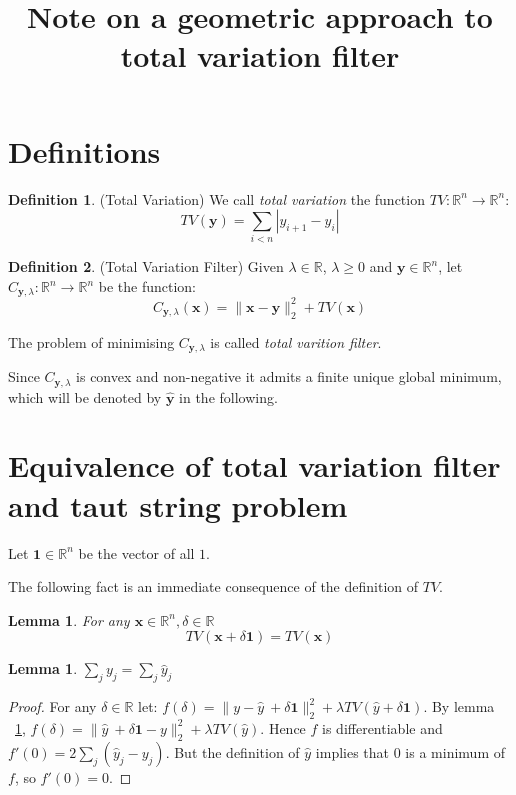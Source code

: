 \documentclass{article}
\newtheorem{lemma}[theorem]{Lemma}
\theoremstyle{definition}
\newtheorem{definition}{Definition}[section]
\def\*#1{\mathbf{#1}}
\def\R{\mathbb{R}}
\begin{document}
\title{Note on a geometric approach to total variation filter}
\author{}

\maketitle

\section{Definitions}

\begin{definition}{(Total Variation)}
  We call {\em total variation} the function $TV:\R^n \rightarrow \R^n$:
  \[TV(\*y) = \sum_{i < n} |y_{i+1} - y_{i}| \]
\end{definition}

\begin{definition}{(Total Variation Filter)}
  Given $\lambda \in \R$, $\lambda \geq 0$ and $\*y \in \R^n$, let $C_{\*y, \lambda}: \R^n \rightarrow \R^n$
  be the function:
    \[ C_{\*y, \lambda} (\*x) = \|\*x - \*y \|^2_2 + TV(\*x) \]

  The problem of minimising $C_{\*y, \lambda}$ is called {\em total varition filter}.
\end{definition}

Since $C_{\*y, \lambda}$ is convex and non-negative it admits a finite unique global minimum,
which will be denoted by $\hat{\*y}$ in the following.

\section{Equivalence of total variation filter and taut string problem}

Let $\*1 \in \R^n$ be the vector of all $1$.

The following fact is an immediate consequence of the definition of $TV$.

\begin{lemma} \label{lemma:TVconst}
For any $\*x \in \R^{n}, \delta \in \mathbb{R}$
  \[ TV(\*x + \delta \mathbf{1}) = TV(\*x) \]
\end{lemma}

\begin{lemma} $\sum_j y_{j} = \sum_j \hat{y}_{j}$ \end{lemma}
\begin{proof}
  For any $\delta \in \R$ let:
  $f(\delta) = \|y - \hat{y}\ + \delta \mathbf{1}\|^2_2 + \lambda TV(\hat{y} + \delta \mathbf{1})$.
  By lemma ~\ref{lemma:TVconst}, $f(\delta) = \|\hat{y}\ + \delta \mathbf{1} - y\|^2_2 + \lambda TV(\hat{y})$.
  Hence $f$ is differentiable and $f'(0) = 2 \sum_j (\hat{y}_j - y_{j})$. But the definition of $\hat {y}$ implies
  that $0$ is a minimum of $f$, so $f'(0) = 0$.
\end{proof}
\end{document}
